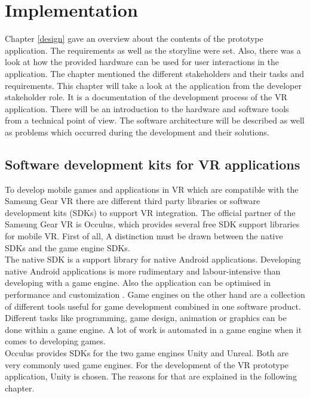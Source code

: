 \chapter{Implementation} \label{implementation}
Chapter \ref{design} gave an overview about the contents of the prototype application. The requirements as well as the storyline were set. Also, there was a look at how the provided hardware can be used for user interactions in the application. The chapter mentioned the different stakeholders and their tasks and requirements. This chapter will take a look at the application from the developer stakeholder role. It is a documentation of the development process of the VR application. There will be an introduction to the hardware and software tools from a technical point of view. The software architecture will be described as well as problems which occurred during the development and their solutions.

\section{Software development kits for VR applications} \label{sdksupport}
To develop mobile games and applications in VR which are compatible with the Samsung Gear VR there are different third party libraries or software development kits (SDKs) to support VR integration. The official partner of the Samsung Gear VR is Occulus, which provides several free SDK support libraries for mobile VR. First of all, A distinction must be drawn between the native SDKs and the game engine SDKs.\\
The native SDK is a support library for native Android applications. Developing native Android applications is more rudimentary and labour-intensive than developing with a game engine. Also the application can be optimised in performance and customization \cite{Occulus.2019}. Game engines on the other hand are a collection of different tools useful for game development combined in one software product. Different tasks like programming, game design, animation or graphics can be done within a game engine. A lot of work is automated in a game engine when it comes to developing games. \cite{?}\\
Occulus provides SDKs for the two game engines Unity and Unreal. Both are very commonly used game engines. For the development of the VR prototype application, Unity is chosen. The reasons for that are explained in the following chapter.

